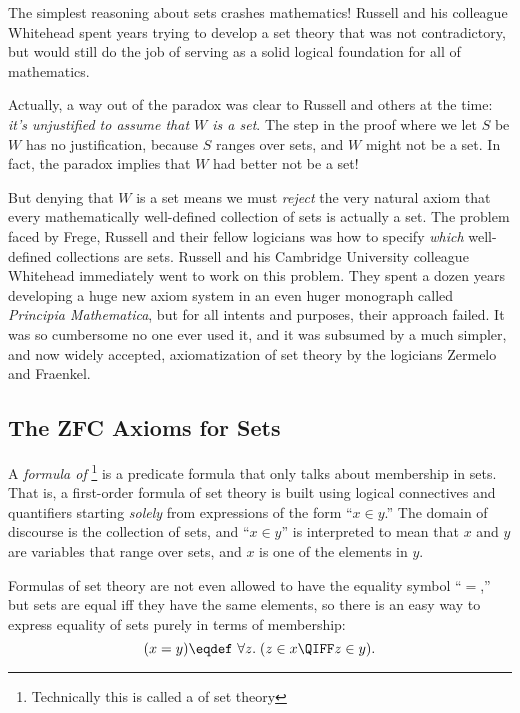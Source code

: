 The simplest reasoning about sets crashes mathematics!  Russell and his
colleague Whitehead spent years trying to develop a set theory that was
not contradictory, but would still do the job of serving as a solid
logical foundation for all of mathematics.

Actually, a way out of the paradox was clear to Russell and others at
the time: \emph{it's unjustified to assume that $W$ is a set}.  The
step in the proof where we let $S$ be $W$ has no justification,
because $S$ ranges over sets, and $W$ might not be a set.  In fact, the
paradox implies that $W$ had better not be a set!

But denying that $W$ is a set means we must \emph{reject} the very
natural axiom that every mathematically well-defined collection of
sets is actually a set.  The problem faced by Frege, Russell and their
fellow logicians was how to specify \emph{which} well-defined
collections are sets.  Russell and his Cambridge University colleague
Whitehead immediately went to work on this problem.  They spent a
dozen years developing a huge new axiom system in an even huger
monograph called \emph{Principia Mathematica}, but for all intents and
purposes, their approach failed.  It was so cumbersome no one ever
used it, and it was subsumed by a much simpler, and now widely
accepted, axiomatization of set theory by the logicians Zermelo
and Fraenkel.

\subsection{The ZFC Axioms for Sets}\label{ZFC_sec}

A \emph{formula of }\footnote{Technically this is
  called a  of set theory} is a predicate
formula that only talks about membership in sets.  That is, a
first-order formula of set theory is built using logical connectives
and quantifiers starting \emph{solely} from expressions of the form ``$x\in
y$.''  The domain of discourse is the collection of sets, and ``$x \in
y$'' is interpreted to mean that $x$ and $y$ are variables that range
over sets, and $x$ is one of the elements in $y$.

Formulas of set theory are not even allowed to have the equality
symbol ``$=$,'' but sets are equal iff they have the same elements, so
there is an easy way to express equality of sets purely in terms of
membership:
\begin{equation}\label{xsetequaly}
(x = y) \eqdef\  \forall z.\; (z \in x \QIFF z \in y).
\end{equation}

